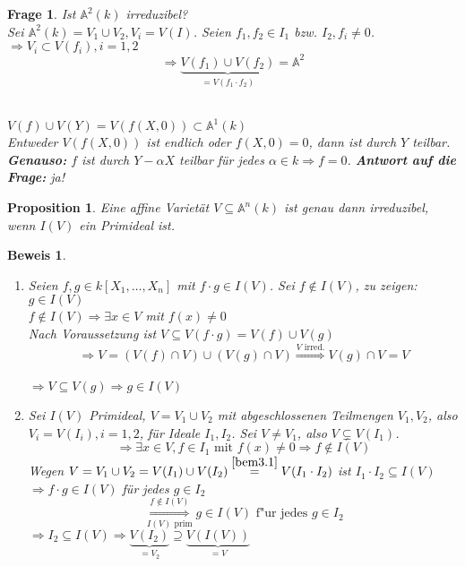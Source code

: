 \documentclass[a4paper,12pt]{report}
\theoremstyle{break}
\newtheorem{Prop}[Def]{Proposition}
\theoremstyle{nonumberbreak}
\newtheorem{Frag}{Frage}
\newtheorem{Bew}{Beweis}
\theoremstyle{nonumberplain}
\newcommand{\quot}[1]{\textrm{\glqq}{#1}\textrm{\grqq}}
\newcommand{\linetitle}[1]{\textbf{#1}}
\newenvironment{twosidedproof}{\begin{enumerate}[\quot{$\Rightarrow$}:]}{\end{enumerate}}
\newcommand{\proofforward}{\item[\quot{$\Rightarrow$}:]}
\newcommand{\proofreverse}{\item[\quot{$\Leftarrow$}:]}
\newcommand{\A}{\mathbb{A}}
\begin{document}
\begin{Frag}
Ist $\A ^2(k)$ irreduzibel?\\
Sei $\A ^2(k)=V_1 \cup V_2, V_i=V(I)$. Seien $f_1, f_2 \in I_1$ bzw. $I_2, f_i \not= 0$.\\
$\Rightarrow V_i \subset V(f_i), i = 1,2$\\
\[\Rightarrow \underbrace{V(f_1)\cup V(f_2)}_{=V(f_1\cdot f_2)} = \A ^2\]
\\
$V(f)\cup V(Y) = V(f(X,0)) \subset \A ^1(k)$\\
Entweder $V(f(X,0))$ ist endlich \emph{oder} $f(X,0)=0$, dann ist durch $Y$ teilbar.
\linetitle{Genauso:} $f$ ist durch $Y-\alpha X$ teilbar f\"ur jedes $\alpha \in k \Rightarrow f=0$.
\linetitle{Antwort auf die Frage:} ja!
\end{Frag}

\begin{Prop}
Eine affine Variet\"at $V\subseteq \A ^n(k)$ ist genau dann irreduzibel, wenn $I(V)$ ein Primideal ist.
\end{Prop}

\begin{Bew}\begin{twosidedproof}
\proofforward
Seien $f,g\in k[X_1,\dots ,X_n]$ mit $f\cdot g \in I(V)$. Sei $f\notin I(V)$, zu zeigen: $g\in I(V)$\\
$f\notin I(V) \Rightarrow \exists x\in V$ mit $f(x) \not= 0$\\
Nach Voraussetzung ist $V\subseteq V(f\cdot g) = V(f)\cup V(g)$\\
\[\Rightarrow V=\left(V(f)\cap V\right) \cup \left(V(g)\cap V\right) \stackrel{V \textrm{ irred.}}\Rightarrow V(g)\cap V = V\]\\
$\Rightarrow V\subseteq V(g) \Rightarrow g\in I(V)$

\proofreverse
Sei $I(V)$ Primideal, $V=V_1\cup V_2$ mit abgeschlossenen Teilmengen $V_1,V_2$, also $V_i=V(I_i), i=1,2$, f\"ur Ideale $I_1,I_2$. Sei $V\not= V_1$, also $V\subsetneq V(I_1)$.
\[\Rightarrow \exists x\in V, f\in I_1 \textrm{ mit } f(x) \neq 0 \Rightarrow f\notin I(V)\]
Wegen $V= V_1 \cup V_2=V(I_1)\cup V(I_2) \stackrel{\autoref{bem3.1}}=V(I_1\cdot I_2)$ ist $I_1\cdot I_2 \subseteq I(V)$\\
$\Rightarrow f\cdot g \in I(V)$ f\"ur jedes $g\in I_2$
\[\overset{f\notin I(V)}{\underset{I(V) \textrm{ prim}}{\Rightarrow}} g \in I(V) \textrm{ f"ur jedes }g \in I_2\]
$\Rightarrow I_2\subseteq I(V) \Rightarrow \underbrace{V(I_2)}_{=V_2} \supseteq \underbrace{V(I(V))}_{=V}$
\end{twosidedproof}\end{Bew}
\end{document}

